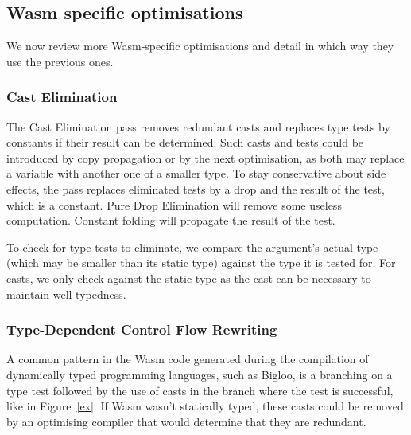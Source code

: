 \documentclass[a4paper,11pt]{article}
\begin{document}

\subsection{Wasm specific optimisations}
We now review more Wasm-specific optimisations and detail in which way they use
the previous ones.
\subsubsection{Cast Elimination}
The Cast Elimination pass removes redundant casts and replaces type tests by
constants if their result can be determined. Such casts and tests could be
introduced by copy propagation or by the next optimisation, as both may replace
a variable with another one of a smaller type. To stay conservative about side
effects, the pass replaces eliminated tests by a \textsf{drop} and the result of
the test, which is a constant. Pure Drop Elimination will remove some useless
computation. Constant folding will propagate the result of the test.

To check for type tests to eliminate, we compare the argument's actual type
(which may be smaller than its static type) against the type it is tested for.
For casts, we only check against the static type as the cast can be necessary to
maintain well-typedness.

\subsubsection{Type-Dependent Control Flow Rewriting}
A common pattern in the Wasm code generated during the compilation of
dynamically typed programming languages, such as Bigloo, is a branching on a
type test followed by the use of casts in the branch where the test is
successful, like in Figure~\ref{ex}. If Wasm wasn't statically typed, these
casts could be removed by an optimising compiler that would determine that they
are redundant.
\end{document}
